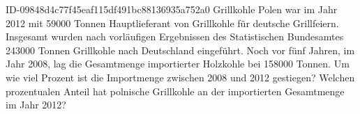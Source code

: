 \begin{exercise}
      {ID-09848d4c77f45eaf115df491bc88136935a752a0}
      {Grillkohle}
  \ifproblem\problem
    Polen war im Jahr 2012 mit \num{59000} Tonnen Hauptlieferant von Grillkohle für
    deutsche Grillfeiern. Insgesamt wurden nach vorläufigen Ergebnissen des
    Statistischen Bundesamtes \num{243000} Tonnen Grillkohle nach Deutschland
    eingeführt. Noch vor fünf Jahren, im Jahr 2008, lag die Gesamtmenge
    importierter Holzkohle bei \num{158000} Tonnen.
    Um wie viel Prozent ist die Importmenge zwischen 2008 und 2012 gestiegen?
    Welchen prozentualen Anteil hat polnische Grillkohle an der importierten
    Gesamtmenge im Jahr 2012?
  \fi
\end{exercise}
